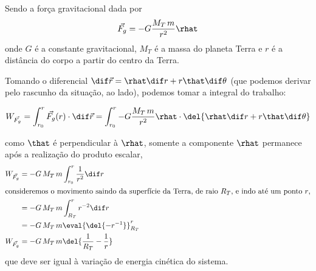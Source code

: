 \documentclass[]{IMTexam}
\begin{document}
\begin{questions}
\begin{solution}
\begin{multi}
			Sendo a força gravitacional dada por
			\begin{equation}\label{eq:gforce}
				\vec{F_g}=-G\dfrac{M_T\,m}{r^{2}}\rhat
			\end{equation}
			onde $ G $ é a constante gravitacional, $ M_T $ é a massa do planeta Terra e $ r $ é a distância do corpo a partir do centro da Terra.

			Tomando o diferencial $ \dif\vec{r}=\rhat\dif r+r\that\dif\theta $ (que podemos derivar pelo rascunho da situação, ao lado), podemos tomar a integral do trabalho:

			\nextcol

			\centering
		\end{multi}

		\[ 	W_{\vec{F_g}}=\int_{r_0}^{r}\vec{F_g}(r)\cdot\dif\vec{r}=\int_{r_0}^{r}-G\dfrac{M_T\,m}{r^{2}}\rhat\cdot\del{\rhat\dif r+r\that\dif\theta} \]

		\begin{multi}[2][t]
			como $ \that $ é perpendicular à $ \rhat $, somente a componente $ \rhat $ permanece após a realização do produto escalar,
			\begin{align*}
				W_{\vec{F_g}} & =-G\,M_T\,m\int_{r_0}^{r}\dfrac{1}{r^{2}}\dif r \\
				\intertext{consideremos o movimento saindo da superfície da Terra, de raio $ R_T $, e indo até um ponto $ r $,}
				              & =-G\,M_T\,m\int_{R_T}^{r}r^{-2}\dif r           \\
				              & =-G\,M_T\,m\eval{\del{-r^{-1}}}_{R_T}^{r}       \\
				W_{\vec{F_g}} & =-G\,M_T\,m\del{\dfrac{1}{R_T}-\dfrac{1}{r}}
			\end{align*}
			que deve ser igual à variação de energia cinética do sistema.


\end{multi}
\end{solution}
\end{questions}
\end{document}
